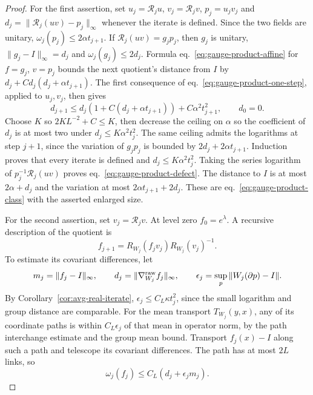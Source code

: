 \documentclass[11pt,letterpaper,reqno]{amsart}
\numberwithin{equation}{section}
\renewcommand{\eqref}[1]{\textup{eq.~\ref{#1}}}
\theoremstyle{definition}
\theoremstyle{remark}
\begin{document}
\begin{proof}
For the first assertion, set \(u_j=\mathcal R_j u\),
\(v_j=\mathcal R_jv\), \(p_j=u_jv_j\) and
\(d_j=\|\mathcal R_j(uv)-p_j\|_\infty\) whenever the iterate
is defined. Since the two fields are unitary,
\(\omega_j(p_j)\leq 2\alpha t_{j+1}\).
If \(\mathcal R_j(uv)=g_jp_j\), then \(g_j\) is unitary,
\(\|g_j-I\|_\infty=d_j\) and
\(\omega_j(g_j)\leq 2d_j\).
Formula \eqref{eq:gauge-product-affine} for \(f=g_j\), \(v=p_j\)
bounds the next quotient's distance from \(I\) by
\(d_j+C d_j(d_j+\alpha t_{j+1})\). The first consequence
of \eqref{eq:gauge-product-one-step}, applied to \(u_j,v_j\),
then gives
\begin{equation}\label{eq:gauge-product-recurrence}
 d_{j+1}\leq d_j(1+C(d_j+\alpha t_{j+1}))
                   +C\alpha^2t_{j+1}^2,\qquad d_0=0 .
\end{equation}
Choose \(K\) so \(2K L^{-2}+C\leq K\), then decrease the
ceiling on \(\alpha\) so the coefficient of \(d_j\) is at most
two under \(d_j\leq K\alpha^2t_j^2\). The same ceiling admits
the logarithms at step \(j+1\), since the variation of \(g_jp_j\)
is bounded by \(2d_j+2\alpha t_{j+1}\).
Induction proves that every iterate is defined and
\(d_j\leq K\alpha^2t_j^2\). Taking the series logarithm of
\(p_j^{-1}\mathcal R_j(uv)\) proves \eqref{eq:gauge-product-defect}.
The distance to \(I\) is at most \(2\alpha+d_j\) and the
variation at most \(2\alpha t_{j+1}+2d_j\). These are
\eqref{eq:gauge-product-class} with the asserted enlarged size.

For the second assertion, set \(v_j=\mathcal R_jv\).
At level zero \(f_0=e^\lambda\). A recursive description of
the quotient is
\[
 f_{j+1}=R_{W_j}(f_jv_j)R_{W_j}(v_j)^{-1}.
\]
To estimate its covariant differences, let
\[
 m_j=\|f_j-I\|_\infty,\qquad
 d_j=\|\nabla^{\rm raw}_{W_j} f_j\|_\infty,\qquad
 \epsilon_j=\sup_p\|W_j(\partial p)-I\|.
\]
By Corollary~\ref{cor:avg-real-iterate},
\(\epsilon_j\leq C_L\kappa t_j^2\), since the small logarithm
and group distance are comparable. For the mean transport
\(T_{W_j}(y,x)\), any of its coordinate paths is within
\(C_L\epsilon_j\) of that mean in operator norm, by the path
interchange estimate and the group mean bound. Transport
\(f_j(x)-I\) along such a path and telescope its covariant
differences. The path has at most \(2L\) links, so
\begin{equation}\label{eq:gauge-product-block-variation}
 \omega_j(f_j)\leq C_L(d_j+\epsilon_jm_j).
\end{equation}


\end{proof}
\end{document}
